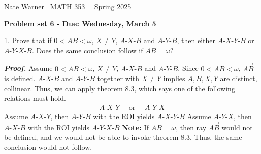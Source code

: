 \documentclass{report}
\title{\Huge{}}
\author{\huge{Nathan Warner}}
\date{\huge{}}
\begin{document}
    \pagebreak \bigbreak \noindent
    Nate Warner \ \quad \quad \quad \quad \quad \quad \quad \quad \quad \quad \quad \quad  MATH 353 \quad  \quad \quad \quad \quad \quad \quad \quad \quad \ \ \quad \quad Spring 2025
    \begin{center}
        \textbf{Problem set 6 - Due: Wednesday, March 5}
    \end{center}
    \bigbreak \noindent 
    \begin{mdframed}
        1. Prove that if $0 < AB < \omega$, $X \ne Y$, $ A\text{-}X\text{-}B$ and $ A\text{-}Y\text{-}B$, then either $ A\text{-}X\text{-}Y\text{-}B$ or $ A\text{-}Y\text{-}X\text{-}B$. Does the same conclusion follow if $AB = \omega $?
    \end{mdframed}
    \bigbreak \noindent 
    \textbf{\textit{Proof.}} Assume $0 < AB < \omega$, $X \ne Y$, $ A\text{-}X\text{-}B$ and $ A\text{-}Y\text{-}B$. Since $0 < AB < \omega$, $\overrightarrow{AB}$ is defined.
    \bigbreak \noindent 
    $ A\text{-}X\text{-}B$ and $ A\text{-}Y\text{-}B$ together with $X \ne Y$ implies $A,B,X,Y$ are distinct, collinear. Thus, we can apply theorem 8.3, which says one of the following relations must hold.
    \begin{align*}
       A\text{-}X\text{-}Y \quad \text{ or } \quad A\text{-}Y\text{-}X 
    \end{align*}
    Assume $ A\text{-}X\text{-}Y$, then $ A\text{-}Y\text{-}B$ with the ROI yields $ A\text{-}X\text{-}Y\text{-}B $
    \bigbreak \noindent 
    Assume $ A\text{-}Y\text{-}X$, then $ A\text{-}X\text{-}B$ with the ROI yields $ A\text{-}Y\text{-}X\text{-}B$ \endpf
    \bigbreak \noindent 
    \textbf{Note:} If $AB = \omega$, then ray $\overrightarrow{AB}$ would not be defined, and we would not be able to invoke theorem 8.3. Thus, the same conclusion would not follow.
\end{document}
